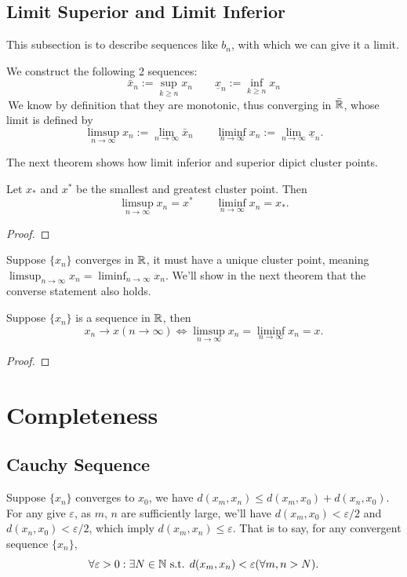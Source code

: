 \subsection{Limit Superior and Limit Inferior}
This subsection is to describe sequences like $b_n$, with which we can give it a limit.

\begin{definition}
    We construct the following 2 sequences:
    $$
        \bar{x}_n := \sup_{k\geq n} x_n \qquad \underline{x}_{n} := \inf_{k\geq n} x_n
    $$
    \,We know by definition that they are monotonic, thus converging in $\bar{\mathbb{R}}$, whose limit is defined by 
    $$\limsup_{n\to \infty} x_n := \lim_{n \to \infty} \bar{x}_n \qquad \liminf_{n\to \infty} x_n := \lim_{n \to \infty} \underline{x}_{n}.$$
\end{definition}

The next theorem shows how limit inferior and superior dipict cluster points.
\begin{theorem}
    Let $x_*$ and $x^*$ be the smallest and greatest cluster point. Then
    $$\limsup_{n\to \infty} x_n = x^* \qquad \liminf_{n\to \infty} x_n = x_*.$$
\end{theorem}
\begin{proof}
    
\end{proof}

Suppose $\{x_n\}$ converges in $\mathbb{R}$, it must have a unique cluster point, meaning $\limsup_{n\to \infty} x_n = \liminf_{n\to \infty} x_n$. 
We'll show in the next theorem that the converse statement also holds.
\begin{theorem}
    Suppose $\{x_n\}$ is a sequence in $\mathbb{R}$, then 
    $$x_n\to x (n\to \infty) \iff \limsup_{n\to \infty} x_n = \liminf_{n\to \infty} x_n = x.$$
\end{theorem}
\begin{proof}
    
\end{proof}

\section{Completeness}
\subsection{Cauchy Sequence}
Suppose $\{x_n\}$ converges to $x_0$, we have $d(x_m,x_n) \leq d(x_m,x_0) +d(x_n,x_0)$. For any give $\varepsilon$, as $m$, $n$ are sufficiently large, we'll have $d(x_m,x_0)< \varepsilon/2$ and $d(x_n,x_0)< \varepsilon /2$, which imply
$d(x_m,x_n) \leq \varepsilon$. That is to say, for any convergent sequence $\{x_n\}$,
$$\forall \varepsilon>0 : \exists N\in \mathbb{N} \text{ s.t. } d(x_m,x_n) < \varepsilon (\forall m,n > N).$$ 

